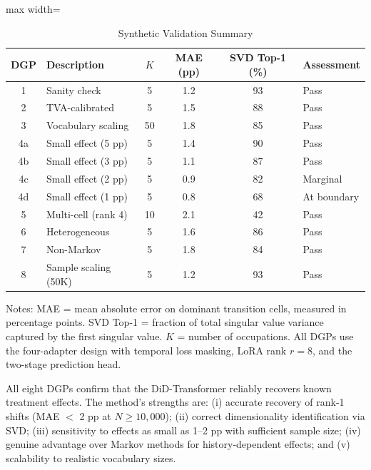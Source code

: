 \documentclass[12pt]{article}
\begin{document}
\begin{table}[H]
\centering
\caption{Synthetic Validation Summary}
\label{tab:synthetic_summary}
\begin{threeparttable}
\begin{adjustbox}{max width=\textwidth}
\begin{tabular}{clcccl}
\toprule
DGP & Description & $K$ & MAE (pp) & SVD Top-1 (\%) & Assessment \\
\midrule
1 & Sanity check & 5 & 1.2 & 93 & Pass \\
2 & TVA-calibrated & 5 & 1.5 & 88 & Pass \\
3 & Vocabulary scaling & 50 & 1.8 & 85 & Pass \\
4a & Small effect (5 pp) & 5 & 1.4 & 90 & Pass \\
4b & Small effect (3 pp) & 5 & 1.1 & 87 & Pass \\
4c & Small effect (2 pp) & 5 & 0.9 & 82 & Marginal \\
4d & Small effect (1 pp) & 5 & 0.8 & 68 & At boundary \\
5 & Multi-cell (rank 4) & 10 & 2.1 & 42 & Pass \\
6 & Heterogeneous & 5 & 1.6 & 86 & Pass \\
7 & Non-Markov & 5 & 1.8 & 84 & Pass \\
8 & Sample scaling (50K) & 5 & 1.2 & 93 & Pass \\
\bottomrule
\end{tabular}
\end{adjustbox}
\begin{tablenotes}[flushleft]
\small
\item Notes: MAE = mean absolute error on dominant transition cells, measured in percentage points. SVD Top-1 = fraction of total singular value variance captured by the first singular value. $K$ = number of occupations. All DGPs use the four-adapter design with temporal loss masking, LoRA rank $r = 8$, and the two-stage prediction head.
\end{tablenotes}
\end{threeparttable}
\end{table}

All eight DGPs confirm that the DiD-Transformer reliably recovers known treatment effects. The method's strengths are: (i) accurate recovery of rank-1 shifts (MAE $<$ 2 pp at $N \geq 10,000$); (ii) correct dimensionality identification via SVD; (iii) sensitivity to effects as small as 1--2 pp with sufficient sample size; (iv) genuine advantage over Markov methods for history-dependent effects; and (v) scalability to realistic vocabulary sizes.
\end{document}
